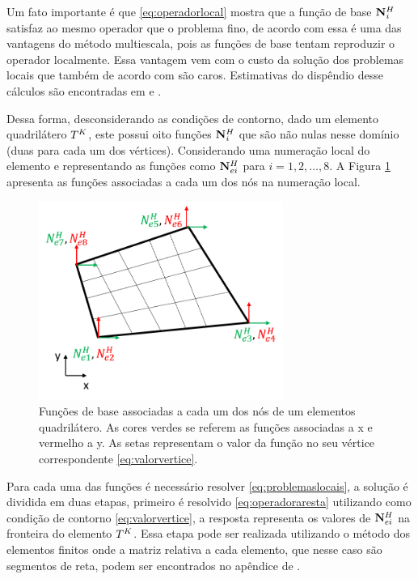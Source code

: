 Um fato importante é que \eqref{eq:operadorlocal} mostra que a função de base $\mathbf{N}_{i}^H$ satisfaz ao mesmo operador que o problema fino, de acordo com \citet{thomashou} essa é uma das vantagens do método multiescala, pois as funções de base tentam reproduzir o operador localmente. Essa vantagem vem com o custo da solução dos problemas locais que também de acordo com \citet{thomashou} são caros. Estimativas do dispêndio desse cálculos são encontradas em \citet{msparalelo} e \citet{mbuck}.

Dessa forma, desconsiderando as condições de contorno, dado um elemento quadrilátero $T^K$, este possui oito funções $\mathbf{N}_{i}^H$ que são não nulas nesse domínio (duas para cada um dos vértices). Considerando uma numeração local do elemento e representando as funções como ${\mathbf{N}_{ei}^H}$ para $i=1,2,\dots, 8$. A Figura \ref{fig:coarsefunctionslocalnum} apresenta as funções associadas a cada um dos nós na numeração local.


\begin{figure}[!htbp]
\centering
\includegraphics[width=8cm]{chap06/figs/funcoesDeBaseGrossasColorido.png}
\caption{Funções de base associadas a cada um dos nós de um elementos quadrilátero. As cores verdes se referem as funções associadas a x e vermelho a y. As setas representam o valor da função no seu vértice correspondente \eqref{eq:valorvertice}.}
\label{fig:coarsefunctionslocalnum}
\end{figure}

Para cada uma das funções é necessário resolver \eqref{eq:problemaslocais}, a solução é dividida em duas etapas, primeiro é resolvido \eqref{eq:operadoraresta} utilizando como condição de contorno \eqref{eq:valorvertice}, a resposta representa os valores de ${\mathbf{N}_{ei}^H}$  na fronteira do elemento $T^K$. Essa etapa pode ser realizada utilizando o  método dos elementos finitos onde a matriz relativa a cada elemento, que nesse caso são segmentos de reta, podem ser encontrados no apêndice de \cite{casteletto}. 


